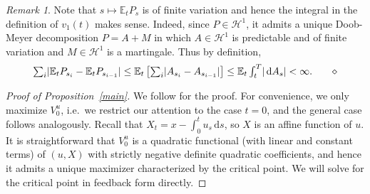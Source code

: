 \documentclass[openany,oneside]{article}
\theoremstyle{definition}
\theoremstyle{remark}
\newtheorem{rem}[thm]{Remark}
\newcommand{\E}{\mathbb{E}} %
\DeclarePairedDelimiter{\abs}{\lvert}{\rvert} %
\newcommand{\ts}{\textstyle}
\newcommand{\closeEqn}{\tag*{$\diamond$}}
\newcommand{\de}{\,\mathrm{d}}
\begin{document}
\begin{rem}\label{RemIntegral}
Note that $s\mapsto \E_t P_s$ is of finite variation and hence the integral in the definition of $v_1(t)$ makes sense. Indeed, since $P\in \mathcal{H}^1$, it admits a unique Doob-Meyer decomposition $P=A+M$ in which $A\in\mathcal{H}^1$ is predictable and of finite variation and $M\in\mathcal{H}^1$ is a martingale. Thus by definition,
\[
 \ts \sum_i \abs{\E_t P_{s_i} - \E_t P_{s_{i-1}}} \le \E_t\left[\sum_i \abs{A_{s_i} - A_{s_{i-1}}}\right] \le \E_t \int_t^T \abs{\de A_s} < \infty.\closeEqn
\]
\end{rem}

\begin{proof}[Proof of Proposition~\ref{main}]
We follow \cite{bouchard2017equilibrium} for the proof. For convenience, we only maximize $V^u_0$, i.e.\ we restrict our attention to the case $t=0$, and the general case follows analogously. Recall that $X_t = x-\int_0^t u_s \de s$, so $X$ is an affine function of $u$. It is straightforward that $V^u_0$ is a quadratic functional (with linear and constant terms) of $(u,X)$ with strictly negative definite quadratic coefficients, and hence it admits a unique maximizer characterized by the critical point. We will solve for the critical point in feedback form directly.


\end{proof}
\end{document}
